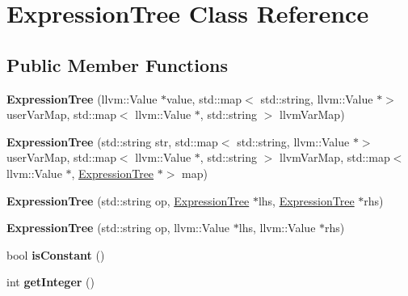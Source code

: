 \hypertarget{classExpressionTree}{}\section{Expression\+Tree Class Reference}
\label{classExpressionTree}
\subsection*{Public Member Functions}
\begin{DoxyCompactItemize}
\item 
{\bfseries Expression\+Tree} (llvm\+::\+Value $\ast$value, std\+::map$<$ std\+::string, llvm\+::\+Value $\ast$$>$ user\+Var\+Map, std\+::map$<$ llvm\+::\+Value $\ast$, std\+::string $>$ llvm\+Var\+Map)\hypertarget{classExpressionTree_ab550dbe48d21130d4812bd313921fc13}{}\label{classExpressionTree_ab550dbe48d21130d4812bd313921fc13}

\item 
{\bfseries Expression\+Tree} (std\+::string str, std\+::map$<$ std\+::string, llvm\+::\+Value $\ast$$>$ user\+Var\+Map, std\+::map$<$ llvm\+::\+Value $\ast$, std\+::string $>$ llvm\+Var\+Map, std\+::map$<$ llvm\+::\+Value $\ast$, \hyperlink{classExpressionTree}{Expression\+Tree} $\ast$$>$ map)\hypertarget{classExpressionTree_af2f9f6519128e34af038cac8117babc7}{}\label{classExpressionTree_af2f9f6519128e34af038cac8117babc7}

\item 
{\bfseries Expression\+Tree} (std\+::string op, \hyperlink{classExpressionTree}{Expression\+Tree} $\ast$lhs, \hyperlink{classExpressionTree}{Expression\+Tree} $\ast$rhs)\hypertarget{classExpressionTree_a246d3b7f66aac88c17754a592395fe69}{}\label{classExpressionTree_a246d3b7f66aac88c17754a592395fe69}

\item 
{\bfseries Expression\+Tree} (std\+::string op, llvm\+::\+Value $\ast$lhs, llvm\+::\+Value $\ast$rhs)\hypertarget{classExpressionTree_a6538e20d3f5e0e063142d2569b2e0510}{}\label{classExpressionTree_a6538e20d3f5e0e063142d2569b2e0510}

\item 
bool {\bfseries is\+Constant} ()\hypertarget{classExpressionTree_a4350a6fec4fc4cb8f98379723bc3b1d8}{}\label{classExpressionTree_a4350a6fec4fc4cb8f98379723bc3b1d8}

\item 
int {\bfseries get\+Integer} ()\hypertarget{classExpressionTree_affdc9f9bd4d32e99829cc457bca5afb2}{}\label{classExpressionTree_affdc9f9bd4d32e99829cc457bca5afb2}


\end{DoxyCompactItemize}
